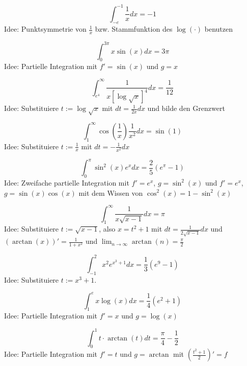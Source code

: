 \begin{displaymath}
  \int_{-e}^{-1} \frac{1}{x} dx = -1
\end{displaymath}
Idee: Punktsymmetrie von $\frac{1}{x}$ bzw. Stammfunktion des $\log(\cdot)$ benutzen

\begin{displaymath}
  \int_{0}^{3\pi} x \sin(x) dx = 3\pi
\end{displaymath}
Idee: Partielle Integration mit $f' = \sin(x)$ und $g = x$

\begin{displaymath}
  \int_{e^4}^{\infty} \frac{1}{x[\log\sqrt{x}]^4}dx = \frac{1}{12}
\end{displaymath}
Idee: Substituiere $t := \log\sqrt{x}$ mit $dt = \frac{1}{2x}dx$ und bilde den Grenzwert

\begin{displaymath}
  \int_{1}^{\infty} \cos\left(\frac{1}{x}\right) \frac{1}{x^2} dx = \sin(1)
\end{displaymath}
Idee: Substituiere $t := \frac{1}{x}$ mit $dt = -\frac{1}{x^2}dx$

\begin{displaymath}
  \int_{0}^{\pi} \sin^2(x) e^x dx = \frac{2}{5} \left(e^{\pi} - 1\right)
\end{displaymath}
Idee: Zweifache partielle Integration mit $f' = e^x$, $g = \sin^2(x)$ und $f' = e^x$, $g = \sin(x)\cos(x)$ mit dem Wissen von $\cos^2(x) = 1 - \sin^2(x)$

\begin{displaymath}
  \int_{1}^{\infty} \frac{1}{x\sqrt{x - 1}} dx = \pi
\end{displaymath}
Idee: Substituiere $t := \sqrt{x - 1}$, also $x = t^2 + 1$ mit $dt = \frac{1}{2\sqrt{x - 1}}dx$ und $\left(\arctan(x)\right)' = \frac{1}{1 + x^2}$ und $\lim_{n \to \infty} \arctan(n) = \frac{\pi}{2}$

\begin{displaymath}
  \int_{-1}^{2} x^2 e^{x^3 + 1} dx = \frac{1}{3} \left(e^9 - 1\right)
\end{displaymath}
Idee: Substituiere $t := x^3 + 1$.

\begin{displaymath}
  \int_{1}^{e} x \log(x) dx = \frac{1}{4} \left(e^2 + 1\right)
\end{displaymath}
Idee: Partielle Integration mit $f' = x$ und $g = \log(x)$

\begin{displaymath}
  \int_{0}^{1} t \cdot \arctan(t) dt = \frac{\pi}{4} - \frac{1}{2}
\end{displaymath}
Idee: Partielle Integration mit $f' = t$ und $g = \arctan$ mit $\left(\frac{t^2 + 1}{2}\right)' = f$

